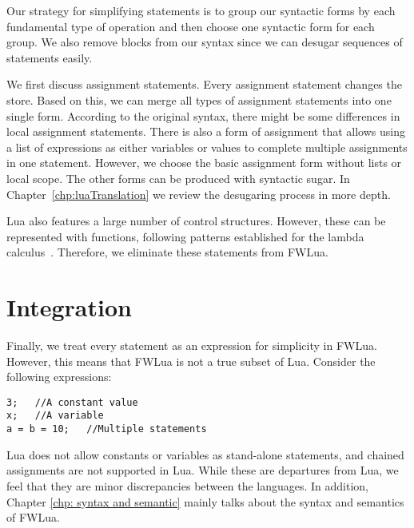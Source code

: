 Our strategy for simplifying statements is to group our syntactic forms by each fundamental type of operation and then choose one syntactic form for each group.
We also remove blocks from our syntax since we can desugar sequences of statements easily.

We first discuss assignment statements.
Every assignment statement changes the store. Based on this, we can merge all types of assignment statements into one single form. According to the original syntax, there might be some differences in local assignment statements.  There is also a form of assignment that allows using a list of expressions as either variables or values to complete multiple assignments in one statement. However, we choose the basic assignment form without lists or local scope.  The other forms can be produced with syntactic sugar.
In Chapter~\ref{chp:luaTranslation} we review the desugaring process in more depth.

Lua also features a large number of control structures.
However, these can be represented with functions,
following patterns established for the lambda calculus~\cite{TAPL}.
Therefore, we eliminate these statements from FWLua.



\section{Integration}
Finally, we treat every statement as an expression for simplicity in FWLua.
However, this means that FWLua is not a true subset of Lua.
Consider the following expressions:

\begin{verbatim}
3;   //A constant value
x;   //A variable
a = b = 10;   //Multiple statements
\end{verbatim}

Lua does not allow constants or variables as stand-alone statements,
and chained assignments are not supported in Lua.
While these are departures from Lua, we feel that they are minor discrepancies between the languages. In addition, Chapter \ref{chp: syntax and semantic} mainly talks about the syntax and semantics of FWLua.



